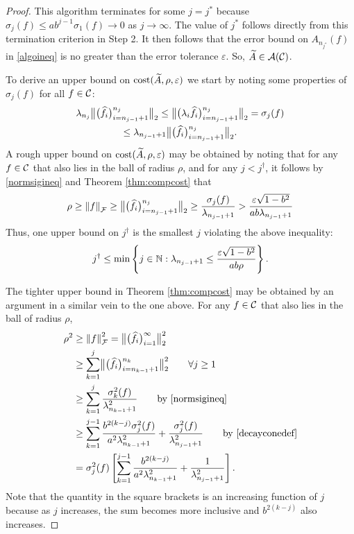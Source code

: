 \documentclass[final]{elsarticle}
\theoremstyle{definition}
\theoremstyle{remark}
\begin{document}
\begin{proof}
This algorithm terminates for some $j = j^*$ because $\sigma_j(f) \le ab^{j-1} \sigma_{1}(f) \to 0$ as $j \to \infty$. The value of $j^*$ follows directly from this termination criterion in Step 2.  It then follows that the error bound on $A_{n_{j^*}}(f)$ in \eqref{algoineq} is no greater than the error tolerance $\varepsilon$.  So, $\tA \in \ca(\cc)$.

To derive an upper bound on $\cost(\tA,\rho,\varepsilon)$ we start by noting some properties of $\sigma_j(f)$ for all $f \in \cc$:
\begin{multline} \label{normsigineq}
\lambda_{n_j} \bignorm[2]{\big( \hf_i \big)_{i=n_{j-1}+1}^{n_j}} \le 
\bignorm[2]{\big( \lambda_i \hf_i \big)_{i=n_{j-1}+1}^{n_j}} = \sigma_j(f) 
\\
\le \lambda_{n_{j-1}+1} \bignorm[2]{\big( \hf_i \big)_{i=n_{j-1}+1}^{n_j}}.
\end{multline}
A rough upper bound on $\cost(\tA,\rho,\varepsilon)$ may be obtained by noting that  for any $f \in \cc$ that also lies in the ball of radius $\rho$, and for any $j < j^\dagger$, it follows by \eqref{normsigineq} and  Theorem \ref{thm:compcost} that 
\begin{equation*}
\rho \ge \norm[\cf]{f} \ge \bignorm[2]{\big( \hf_i \big)_{i=n_{j-1}+1}^{n_j}} \ge \frac{\sigma_j(f)}{\lambda_{n_{j-1}+1}} > \frac{\varepsilon\sqrt{1 - b^2}}{ab \lambda_{n_{j-1}+1}}
\end{equation*}
Thus, one upper bound on $j^\dagger$ is the smallest $j$ violating the above inequality:
\begin{equation} \label{jdaggerlast}
j^\dagger \le \min \left \{j \in \naturals :  \lambda_{n_{j-1}+1} \le \frac{\varepsilon\sqrt{1 - b^2}}{ab \rho} \right\}.
\end{equation}

The tighter upper bound in Theorem \ref{thm:compcost} may be obtained by an argument in a similar vein to the one above.  
For any $f \in \cc$ that also lies in the ball of radius $\rho$,
\begin{align*}
\rho^2 &\ge \norm[\cf]{f}^2 = \bignorm[2]{\big( \hf_i \big)_{i=1}^{\infty}}^2 \\
& \ge \sum_{k=1}^j \bignorm[2]{\big( \hf_i \big)_{i=n_{k-1}+1}^{n_k}}^2 \qquad \forall j \ge 1\\
& \ge \sum_{k=1}^j \frac{\sigma_k^2(f)}{\lambda_{n_{k-1}+1}^2} \qquad \text{by \eqref{normsigineq}}\\
& \ge \sum_{k=1}^{j-1} \frac{ b^{2(k-j)}\sigma_j^2(f)}{a^{2}\lambda_{n_{k-1}+1}^2} + \frac{\sigma_j^2(f)}{\lambda_{n_{j-1}+1}^2} \qquad \text{by \eqref{decayconedef}} \\
& = \sigma_j^2(f) \left[ \sum_{k=1}^{j-1} \frac{b^{2(k-j)}}{a^{2} \lambda_{n_{k-1}+1}^2} + \frac{1}{\lambda_{n_{j-1}+1}^2}\right].
\end{align*}
Note that the quantity in the square brackets is an increasing function of $j$ because as $j$ increases, the sum becomes more inclusive and $b^{2(k-j)}$ also increases.


\end{proof}
\end{document}

